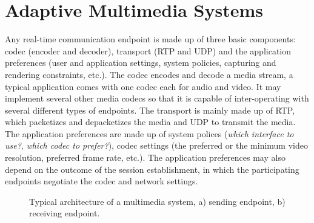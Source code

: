 \section{Adaptive Multimedia Systems}
\label{fw.amusys}

Any real-time communication endpoint is made up of three basic components:
codec (encoder and decoder), transport (RTP and UDP) and the application
preferences (user and application settings, system policies, capturing and
rendering constraints, etc.). The codec encodes and decode a media stream, a
typical application comes with one codec each for audio and video. It may
implement several other media codecs so that it is capable of inter-operating
with several different types of endpoints. The transport is mainly made up of
RTP, which packetizes and depacketizes the media and UDP to transmit the
media. The application preferences are made up of system polices (\emph{which
interface to use?}, \emph{which codec to prefer?}), codec settings (the
preferred or the minimum video resolution, preferred frame rate, etc.). The
application preferences may also depend on the outcome of the session
establishment, in which the participating endpoints negotiate the codec and
network settings.

\begin{figure}
  \centerline{
  }
  
  \caption{Typical architecture of a multimedia system, a) sending endpoint,
  b) receiving endpoint.}
  \label{fig:4:appint}
\end{figure}


